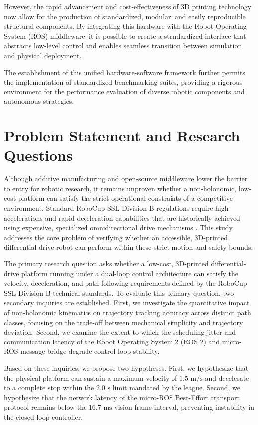\documentclass[a4paper,twoside,12pt]{report}
\begin{document}
However, the rapid advancement and cost-effectiveness of 3D printing technology now allow for the production of standardized, modular, and easily reproducible structural components. By integrating this hardware with the Robot Operating System (ROS) middleware, it is possible to create a standardized interface that abstracts low-level control and enables seamless transition between simulation and physical deployment.

The establishment of this unified hardware-software framework further permits the implementation of standardized benchmarking suites, providing a rigorous environment for the performance evaluation of diverse robotic components and autonomous strategies.

\section{Problem Statement and Research Questions}

Although additive manufacturing and open-source middleware lower the barrier to entry for robotic research, it remains unproven whether a non-holonomic, low-cost platform can satisfy the strict operational constraints of a competitive environment. Standard RoboCup SSL Division B regulations require high accelerations and rapid deceleration capabilities that are historically achieved using expensive, specialized omnidirectional drive mechanisms \citep{ateam2023tdp}. This study addresses the core problem of verifying whether an accessible, 3D-printed differential-drive robot can perform within these strict motion and safety bounds.

The primary research question asks whether a low-cost, 3D-printed differential-drive platform running under a dual-loop control architecture can satisfy the velocity, deceleration, and path-following requirements defined by the RoboCup SSL Division B technical standards. To evaluate this primary question, two secondary inquiries are established. First, we investigate the quantitative impact of non-holonomic kinematics on trajectory tracking accuracy across distinct path classes, focusing on the trade-off between mechanical simplicity and trajectory deviation. Second, we examine the extent to which the scheduling jitter and communication latency of the Robot Operating System 2 (ROS 2) and micro-ROS message bridge degrade control loop stability.

Based on these inquiries, we propose two hypotheses. First, we hypothesize that the physical platform can sustain a maximum velocity of $1.5\text{ m/s}$ and decelerate to a complete stop within the $2.0\text{ s}$ limit mandated by the league. Second, we hypothesize that the network latency of the micro-ROS Best-Effort transport protocol remains below the $16.7\text{ ms}$ vision frame interval, preventing instability in the closed-loop controller.
\end{document}
